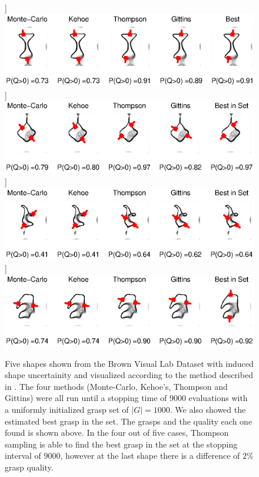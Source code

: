 \documentclass[journal,transmag]{IEEEtran}%
\begin{document}
\begin{figure}%
    \centering
    \qquad
    \subfloat]{{\includegraphics[width=16.5cm]{matlab_figures/shapes_2.eps} }}%
       \subfloat]{{\includegraphics[width=16.5cm]{matlab_figures/shapes_3.eps} }}%
          \subfloat]{{\includegraphics[width=16.5cm]{matlab_figures/shapes_4.eps} }}%
             \subfloat]{{\includegraphics[width=16.5cm]{matlab_figures/shapes_5.eps} }}%
    
    \caption{Five shapes shown from the Brown Visual Lab Dataset with induced shape uncertainity and visualized according to the method described in \cite{mahler2015gp}. The four methods (Monte-Carlo, Kehoe's, Thompson and Gittins) were all run until a stopping time of 9000 evaluations with a uniformly initialized grasp set of $|G|=1000$. We also showed the estimated best grasp in the set.  The grasps and the quality each one found is shown above.  In the four out of five cases, Thompson sampling is able to find the best grasp in the set at the stopping interval of $9000$, however at the last shape there is a difference of $2\%$ grasp quality.   }%
    \label{fig:shape_samples}%
\end{figure}
\end{document}
